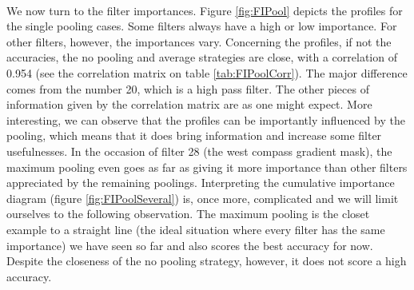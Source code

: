 \documentclass[a4paper]{report}
\begin{document}
	\paragraph{}
	We now turn to the filter importances. Figure \ref{fig:FIPool} depicts the profiles for the single pooling cases. Some filters always have a high or low importance. For other filters, however, the importances vary. Concerning the profiles, if not the accuracies, the no pooling and average strategies are close, with a correlation of 0.954 (see the correlation matrix on table \ref{tab:FIPoolCorr}). The major difference comes from the number 20, which is a high pass filter. %
	The other pieces of information given by the correlation matrix are as one might expect.
	More interesting, we can observe that the profiles can be importantly influenced by the pooling, which means that it does bring information and increase some filter usefulnesses. In the occasion of filter 28 (the west compass gradient mask), the maximum pooling even goes as far as giving it more importance than other filters appreciated by the remaining poolings. 
	Interpreting the cumulative importance diagram (figure \ref{fig:FIPoolSeveral}) is, once more, complicated and we will limit ourselves to the following observation. The maximum pooling is the closet example to a straight line (the ideal situation where every filter has the same importance) we have seen so far and also scores the best accuracy for now. Despite the closeness of the no pooling strategy, however, it does not score a high accuracy.
	
\end{document}

